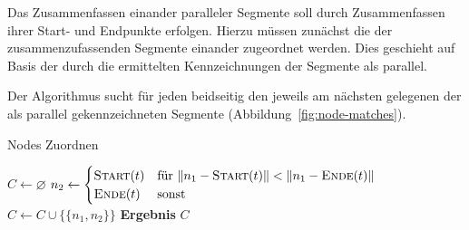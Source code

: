 \documentclass[../main/thesis.tex]{subfiles}
\begin{document}
%
%

Das Zusammenfassen einander paralleler Segmente soll durch Zusammenfassen ihrer Start- und Endpunkte erfolgen.
Hierzu müssen zunächst die  der zusammenzufassenden Segmente einander zugeordnet werden.
Dies geschieht auf Basis der durch die  ermittelten Kennzeichnungen der Segmente als parallel.

Der Algorithmus  sucht für jeden  beidseitig den jeweils am nächsten gelegenen  der als parallel gekennzeichneten Segmente (Abbildung~\ref{fig:node-matches}).

\begin{algorithmhere}{Nodes Zuordnen}
\label{alg:Zuordnen}
\begin{algorithmic}
	\State $C \gets \varnothing$
				\State $n_2 \gets \begin{cases}\textproc{Start}(t) & \text{für } \abs n_1 - \textproc{Start}(t)\abs < \abs n_1 - \textproc{Ende}(t)\abs\\\textproc{Ende}(t) & \text{sonst}\end{cases}$
				\State $C \gets C \cup \{\{n_1, n_2\}\}$
			\EndFor
		\EndFor
	\EndFor
	\State \textbf{Ergebnis} $C$
\EndFunction
\end{algorithmic}
\end{algorithmhere}

\end{document}
